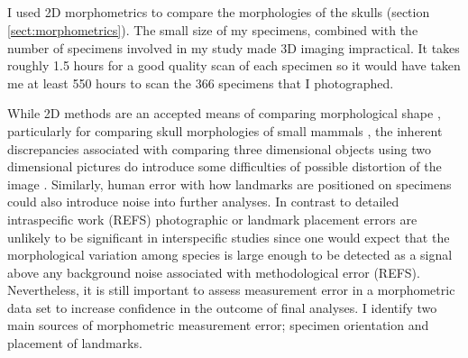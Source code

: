 

\subsection{}

	I used 2D morphometrics to compare the morphologies of the skulls (section \ref{sect:morphometrics}). The small size of my specimens, combined with the number of specimens involved in my study made 3D imaging impractical. It takes roughly 1.5 hours for a good quality scan of each specimen so it would have taken me at least 550 hours to scan the 366 specimens that I photographed.
	 
	While 2D methods are an accepted means of comparing morphological shape \citep[e.g.][]{Adams2004, Mitteroecker2009}, particularly for comparing skull morphologies of small mammals \citep[e.g.][]{Cardini2003, Panchetti2008, White2008, Barrow2008, Scalici2011}, the inherent discrepancies associated with comparing three dimensional objects using two dimensional pictures do introduce some difficulties of possible distortion of the image \citep{Arnqvist1998}. Similarly, human error with how landmarks are positioned on specimens could also introduce noise into further analyses. 
	In contrast to detailed intraspecific work (REFS) photographic or landmark placement errors are unlikely to be significant in interspecific studies since one would expect that the morphological variation among species is large enough to  be detected as a signal above any background noise associated with methodological error (REFS). Nevertheless, it is still important to assess measurement error in a morphometric data set to increase confidence in the outcome of final analyses.
	I identify two main sources of morphometric measurement error; specimen orientation and placement of landmarks.

